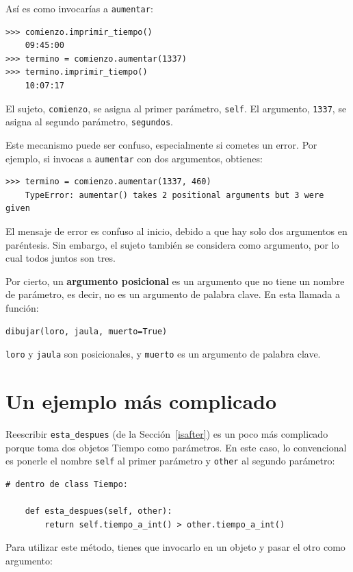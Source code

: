 \documentclass[10pt]{book}
\begin{document}
Así es como invocarías a {\tt aumentar}:

\begin{verbatim}
>>> comienzo.imprimir_tiempo()
    09:45:00
>>> termino = comienzo.aumentar(1337)
>>> termino.imprimir_tiempo()
    10:07:17
\end{verbatim}
%
El sujeto, {\tt comienzo}, se asigna al primer parámetro,
{\tt self}.  El argumento, {\tt 1337}, se asigna al
segundo parámetro, {\tt segundos}.

Este mecanismo puede ser confuso, especialmente si cometes un error.
Por ejemplo, si invocas a {\tt aumentar} con dos argumentos,
obtienes:

\begin{verbatim}
>>> termino = comienzo.aumentar(1337, 460)
    TypeError: aumentar() takes 2 positional arguments but 3 were given
\end{verbatim}
%
El mensaje de error es confuso al inicio, debido a que hay
solo dos argumentos en paréntesis.  Sin embargo, el sujeto también
se considera como argumento, por lo cual todos juntos son tres.

Por cierto, un {\bf argumento posicional} es un argumento que
no tiene un nombre de parámetro, es decir, no es un argumento de
palabra clave.  En esta llamada a función:

\begin{verbatim}
dibujar(loro, jaula, muerto=True)
\end{verbatim}

{\tt loro} y {\tt jaula} son posicionales, y {\tt muerto} es
un argumento de palabra clave.


\section{Un ejemplo más complicado}

Reescribir \verb"esta_despues" (de la Sección~\ref{isafter}) es un poco
más complicado porque toma dos objetos Tiempo como parámetros.  En
este caso, lo convencional es ponerle el nombre {\tt self} al primer parámetro
y {\tt other} al segundo parámetro: 

\begin{verbatim}
# dentro de class Tiempo:

    def esta_despues(self, other):
        return self.tiempo_a_int() > other.tiempo_a_int()
\end{verbatim}
%
Para utilizar este método, tienes que invocarlo en un objeto y pasar
el otro como argumento:
\end{document}
